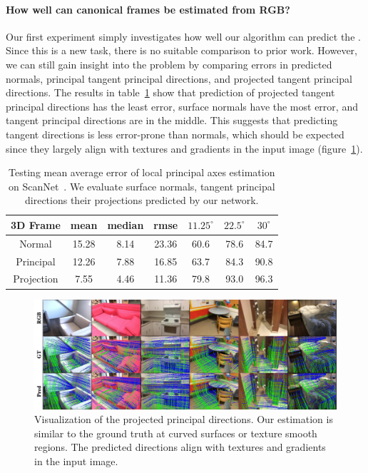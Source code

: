 \vspace{-0.1in}
\paragraph{How well can canonical frames be estimated from RGB?}  Our first experiment simply investigates how well our algorithm can predict the \cframe{}.   Since this is a new task, there is no suitable comparison to prior work.   However, we can still gain insight into the problem by comparing errors in predicted normals, principal tangent principal directions, and projected tangent principal directions.   The results in table~\ref{tab:framenet-3dframe} show that prediction of projected tangent principal directions has the least error, surface normals have the most error, and tangent principal directions are in the middle.   This suggests that predicting tangent directions is less error-prone than normals, which should be expected since they largely align with textures and gradients in the input image (figure~\ref{fig:framenet-project}). 

\begin{table}[t]
    \centering
    \small
    \tabcolsep=0.12cm
    \begin{tabular}{|c|c|c|c||c|c|c|}
        \hline
         \textbf{3D Frame} & mean & median & rmse & $11.25^\circ$ & $22.5^\circ$ & $30^\circ$\\
         \hline
         Normal & 15.28 & 8.14 & 23.36 & 60.6 & 78.6 & 84.7\\
         \hline
         Principal & 12.26 & 7.88 & 16.85 & 63.7 & 84.3 & 90.8\\
         \hline
         Projection & 7.55 & 4.46 & 11.36 & 79.8 & 93.0 & 96.3\\
         \hline
    \end{tabular}
    \caption{Testing mean average error of local principal axes estimation on ScanNet~\cite{dai2017scannet}. We evaluate surface normals, tangent principal directions their projections predicted by our network.}
    \label{tab:framenet-3dframe}
\end{table}

\begin{figure}[t]
    \centering
    \includegraphics[width=\linewidth]{FrameNet/graph/result-ours.pdf}
    \caption{Visualization of the projected principal directions. Our estimation is similar to the ground truth at curved surfaces or texture smooth regions. The predicted directions align with textures and gradients in the input image.}
    \label{fig:framenet-project}
\end{figure}

